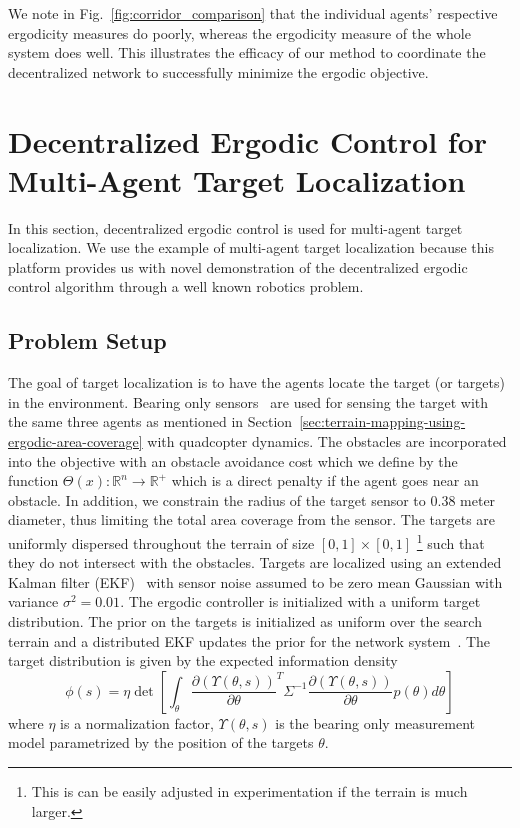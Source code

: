 \documentclass[letterpaper, 10 pt, conference]{ieeeconf}  %
\begin{document}
We note in Fig.~\ref{fig:corridor_comparison} that the individual agents' respective ergodicity measures do poorly, whereas the ergodicity measure of the whole system does well.
This illustrates the efficacy of our method to coordinate the decentralized network to successfully minimize the ergodic objective.


\section{Decentralized Ergodic Control for Multi-Agent Target Localization}
\label{sec:ergodic-control-for-multi-agent-pursuit-evasion-games}
In this section, decentralized ergodic control is used for multi-agent target localization.
We use the example of multi-agent target localization because this platform provides us with novel demonstration of the decentralized ergodic control algorithm through a well known robotics problem.

\subsection{Problem Setup}
The goal of target localization is to have the agents locate the target (or targets) in the environment. 
Bearing only sensors~\cite{mavrommatiTRO2017realTime, deans2001experimental} are used for sensing the target with the same three agents as mentioned in Section~\ref{sec:terrain-mapping-using-ergodic-area-coverage} with quadcopter dynamics.
The obstacles are incorporated into the objective with an obstacle avoidance cost which we define by the function $\Theta(x) : \mathbb{R}^n \to \mathbb{R}^+$ which is a direct penalty if the agent goes near an obstacle.
In addition, we constrain the radius of the target sensor to $0.38$ meter diameter, thus limiting the total area coverage from the sensor.
The targets are uniformly dispersed throughout the terrain of size $[0,1] \times[0,1]$ \footnote{This is can be easily adjusted in experimentation if the terrain is much larger.} such that they do not intersect with the obstacles.
Targets are localized using an extended Kalman filter (EKF)~\cite{kalman1960new, julier1997new} with sensor noise assumed to be zero mean Gaussian with variance $\sigma^2 = 0.01$. 
The ergodic controller is initialized with a uniform target distribution. 
The prior on the targets is initialized as uniform over the search terrain and a distributed EKF updates the prior for the network system~\cite{carli2008distributed}.
The target distribution is given by the expected information density~\cite{miller2016ergodic, mavrommatiTRO2017realTime} 
\begin{equation*} \label{eq:eid}
\phi(s) = \eta \det \left[ \int_\theta  \frac{\partial \left( \Upsilon(\theta, s) \right) }{\partial \theta}^T \Sigma^{-1} \frac{\partial \left( \Upsilon(\theta, s) \right)}{\partial \theta} p(\theta) d\theta \right]
\end{equation*}
where $\eta$ is a normalization factor, $\Upsilon(\theta, s)$ is the bearing only measurement model parametrized by the position of the targets $\theta$.
\end{document}
